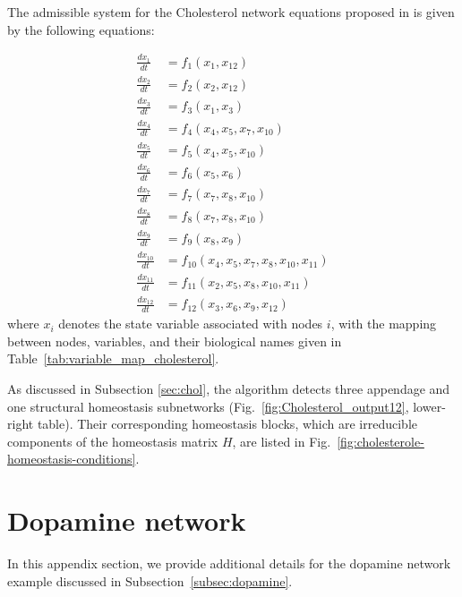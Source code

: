 \documentclass[pdflatex,sn-basic,Numbered]{sn-jnl}
\theoremstyle{thmstyleone}%
\numberwithin{equation}{section}
\begin{document}
The admissible system for the Cholesterol network equations proposed in \cite{pool2018integrated} is given by the following equations:

\begin{equation}\label{eq:cholesterol}
    \begin{aligned}
\frac{dx_1}{dt}  &= f_1\!\left(x_{1}, x_{12}\right)\\
\frac{dx_2}{dt}  &= f_2\!\left(x_{2}, x_{12}\right)\\
\frac{dx_3}{dt}  &= f_3\!\left(x_{1}, x_{3}\right)\\
\frac{dx_4}{dt}  &= f_4\!\left(x_{4}, x_{5}, x_{7}, x_{10}\right)\\
\frac{dx_5}{dt}  &= f_5\!\left(x_{4}, x_{5}, x_{10}\right)\\
\frac{dx_6}{dt}  &= f_6\!\left(x_{5}, x_{6}\right)\\
\frac{dx_7}{dt}  &= f_7\!\left(x_{7}, x_{8}, x_{10}\right)\\
\frac{dx_8}{dt}  &= f_8\!\left(x_{7}, x_{8}, x_{10}\right)\\
\frac{dx_9}{dt}  &= f_9\!\left(x_{8}, x_{9}\right)\\
\frac{dx_{10}}{dt} &= f_{10}\!\left(x_{4}, x_{5}, x_{7}, x_{8}, x_{10}, x_{11}\right)\\
\frac{dx_{11}}{dt} &= f_{11}\!\left(x_{2}, x_{5}, x_{8}, x_{10}, x_{11}\right)\\
\frac{dx_{12}}{dt} &= f_{12}\!\left(x_{3}, x_{6}, x_{9}, x_{12}\right)
\end{aligned}
\end{equation}
where $x_i$ denotes the state variable associated with nodes $i$, with the mapping between nodes, variables, and their biological names given in Table~\ref{tab:variable_map_cholesterol}. 

As discussed in Subsection \ref{sec:chol}, the algorithm detects three appendage and one structural homeostasis subnetworks (Fig.~\ref{fig:Cholesterol_output12}, lower-right table). Their corresponding homeostasis blocks, which are irreducible components of the homeostasis matrix $H$, are listed in Fig.~\ref{fig:cholesterole-homeostasis-conditions}. 




\section{Dopamine network}\label{app:dopamine}

In this appendix section, we provide additional details for the dopamine network example discussed in Subsection~\ref{subsec:dopamine}.
\end{document}
